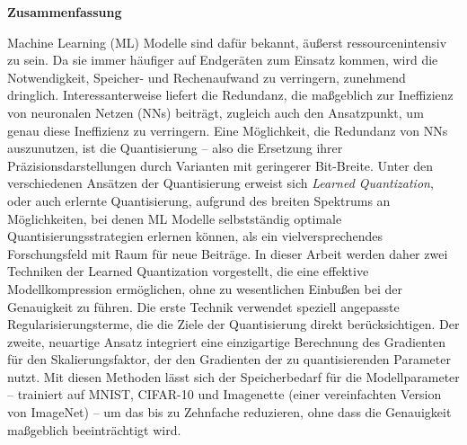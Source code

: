 \thispagestyle{empty}
\vspace*{0.2cm}

\begin{center}
    \textbf{Zusammenfassung} \label{zusammenfassung}
\end{center}

\vspace*{0.2cm}

\noindent 
Machine Learning (ML) Modelle sind dafür bekannt,
äußerst ressourcenintensiv zu sein.
Da sie immer häufiger auf Endgeräten zum Einsatz kommen,
wird die Notwendigkeit, Speicher- und Rechenaufwand zu verringern, zunehmend dringlich.
Interessanterweise liefert die Redundanz,
die maßgeblich zur Ineffizienz von neuronalen Netzen (NNs) beiträgt,
zugleich auch den Ansatzpunkt, um genau diese Ineffizienz zu verringern.
Eine Möglichkeit, die Redundanz von NNs auszunutzen,
ist die Quantisierung –
also die Ersetzung ihrer Präzisionsdarstellungen durch Varianten mit geringerer Bit-Breite.
Unter den verschiedenen Ansätzen der Quantisierung erweist sich
\textit{Learned Quantization}, oder auch erlernte Quantisierung, 
aufgrund des breiten Spektrums an Möglichkeiten,
bei denen ML Modelle selbstständig optimale Quantisierungsstrategien erlernen können,
als ein vielversprechendes Forschungsfeld mit Raum für neue Beiträge.
In dieser Arbeit werden daher zwei Techniken der Learned Quantization vorgestellt,
die eine effektive Modellkompression ermöglichen,
ohne zu wesentlichen Einbußen bei der Genauigkeit zu führen. 
Die erste Technik verwendet speziell angepasste Regularisierungsterme, 
die die Ziele der Quantisierung direkt berücksichtigen. 
Der zweite, neuartige Ansatz integriert eine einzigartige Berechnung des 
Gradienten für den Skalierungsfaktor, 
der den Gradienten der zu quantisierenden Parameter nutzt.
Mit diesen Methoden lässt sich der Speicherbedarf für die Modellparameter
– trainiert auf MNIST, CIFAR-10 und Imagenette
(einer vereinfachten Version von ImageNet)
– um das bis zu Zehnfache reduzieren,
ohne dass die Genauigkeit maßgeblich beeinträchtigt wird.